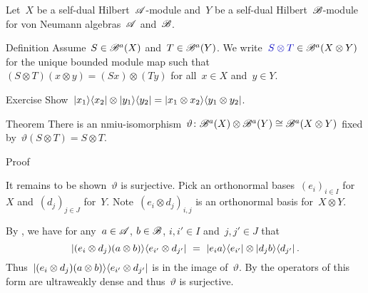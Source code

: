 \documentclass[b]{subfiles}
\begin{document}
\begin{parsec}%
\begin{point}%
Let~$X$ be a self-dual Hilbert~$\mathscr{A}$-module
    and~$Y$ be a self-dual Hilbert~$\mathscr{B}$-module
    for von Neumann algebras~$\mathscr{A}$ and~$\mathscr{B}$.
\end{point}
\begin{point}{Definition}%
Assume~$S \in \mathscr{B}^a(X)$ and~$T \in \mathscr{B}^a(Y)$.
We write~$\Define{S \otimes T} \in \scrB^a(X\otimes Y)$
    for the unique bounded module map
    such that~$(S \otimes T) (x \otimes y) = (S x) \otimes (T y)$
    for all~$x\in X$ and~$y \in Y$.
\end{point}
\begin{point}{Exercise}%
    Show~$\left|x_1\right>\!\left<x_2\right| \otimes \left|y_1\right>\!\left<y_2\right|
            = \left|x_1\otimes x_2\right>\!\left<y_1\otimes y_2\right|$.
\end{point}
\begin{point}{Theorem}%
There is an
    nmiu-isomorphism~$\vartheta\colon \mathscr{B}^a(X) \otimes \mathscr{B}^a(Y) \cong \mathscr{B}^a(X \otimes Y)$
    fixed by~$\vartheta(S\otimes T) = S \otimes T$.
\begin{point}{Proof}%
\begin{point}%
It remains to be shown~$\vartheta$ is surjective.
Pick an orthonormal bases~$(e_i)_{i \in I}$ for~$X$
    and~$(d_j)_{j \in J}$ for~$Y$.
Note~$(e_i \otimes d_j)_{i,j}$ is an orthonormal basis for~$X \otimes Y$.

By ,
    we have for any~$a\in \mathscr{A}$, $b \in \mathscr{B}$,
    $i,i' \in I$ and~$j,j' \in J$ that
\begin{equation*}
    \left|(e_i \otimes d_j) (a\otimes b)\right>\!\left<e_{i'} \otimes d_{j'}\right|
       \ =\ \left|e_i a\right>\!\left<e_{i'}\right| \otimes\left|d_j b\right>\!\left<d_{j'}\right|.
\end{equation*}
Thus~$\left|(e_i \otimes d_j) (a\otimes b)\right>\!\left<e_{i'} \otimes d_{j'}\right|$
    is in the image of~$\vartheta$.
By  the operators of this form
    are ultraweakly dense and thus~$\vartheta$ is surjective.
\end{point}
\end{point}
\end{point}
\end{parsec}
\end{document}
